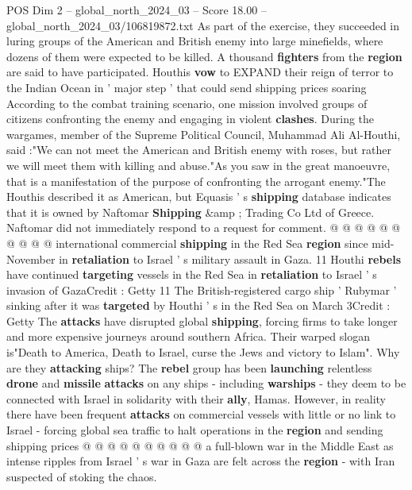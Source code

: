 \begin{textsample}{POS Dim 2 – global\_north\_2024\_03 – Score 18.00 – global\_north\_2024\_03/106819872.txt}  \label{ex:f2_pos_367}
As part of the exercise, they succeeded in luring groups of the American and British enemy into large minefields, where dozens of them were expected to be killed.
A thousand \textbf{fighters} from the \textbf{region} are said to have participated.
Houthis \textbf{vow} to EXPAND their reign of terror to the Indian Ocean in ' major step ' that could send shipping prices soaring According to the combat training scenario, one mission involved groups of citizens confronting the enemy and engaging in violent \textbf{clashes}.
During the wargames, member of the Supreme Political Council, Muhammad Ali Al-Houthi, said :"We can not meet the American and British enemy with roses, but rather we will meet them with killing and abuse."As you saw in the great manoeuvre, that is a manifestation of the purpose of confronting the arrogant enemy."The Houthis described it as American, but Equasis ' s \textbf{shipping} database indicates that it is owned by Naftomar \textbf{Shipping} \&amp ; Trading Co Ltd of Greece.
Naftomar did not immediately respond to a request for comment. @ @ @ @ @ @ @ @ @ @ international commercial \textbf{shipping} in the Red Sea \textbf{region} since mid-November in \textbf{retaliation} to Israel ' s military assault in Gaza. 11 Houthi \textbf{rebels} have continued \textbf{targeting} vessels in the Red Sea in \textbf{retaliation} to Israel ' s invasion of GazaCredit : Getty 11 The British-registered cargo ship ' Rubymar ' sinking after it was \textbf{targeted} by Houthi ' s in the Red Sea on March 3Credit : Getty The \textbf{attacks} have disrupted global \textbf{shipping}, forcing firms to take longer and more expensive journeys around southern Africa.
Their warped slogan is"Death to America, Death to Israel, curse the Jews and victory to Islam".
Why are they \textbf{attacking} ships?
The \textbf{rebel} group has been \textbf{launching} relentless \textbf{drone} and \textbf{missile} \textbf{attacks} on any ships - including \textbf{warships} - they deem to be connected with Israel in solidarity with their \textbf{ally}, Hamas.
However, in reality there have been frequent \textbf{attacks} on commercial vessels with little or no link to Israel - forcing global sea traffic to halt operations in the \textbf{region} and sending shipping prices @ @ @ @ @ @ @ @ @ @ a full-blown war in the Middle East as intense ripples from Israel ' s war in Gaza are felt across the \textbf{region} - with Iran suspected of stoking the chaos.

\end{textsample}
